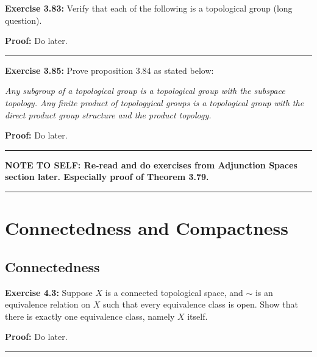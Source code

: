 \documentclass{article}
\begin{document}
\textbf{Exercise 3.83:} Verify that each of the following is a topological group (long question).

\vskip 0.5cm

\textbf{Proof:} Do later.

\vskip 0.5cm
\hrule
\vskip 0.5cm

\textbf{Exercise 3.85:} Prove proposition 3.84 as stated below:

\emph{Any subgroup of a topological group is a topological group with the subspace topology. Any finite product of topologyical groups is a topological group with the direct product group structure and the product topology.}

\vskip 0.5cm

\textbf{Proof:} Do later.

\vskip 0.5cm
\hrule
\vskip 0.5cm

\textbf{NOTE TO SELF: Re-read and do exercises from Adjunction Spaces section later. Especially proof of Theorem 3.79.}

\vskip 0.5cm
\hrule
\vskip 0.5cm

\section{Connectedness and Compactness}

\subsection{Connectedness}

\textbf{Exercise 4.3:} Suppose $X$ is a connected topological space, and $\sim$ is an equivalence relation on $X$ such that every equivalence class is open. Show that there is exactly one
equivalence class, namely $X$ itself.

\vskip 0.5cm

\textbf{Proof:} Do later.

\vskip 0.5cm
\hrule
\vskip 0.5cm
\end{document}
